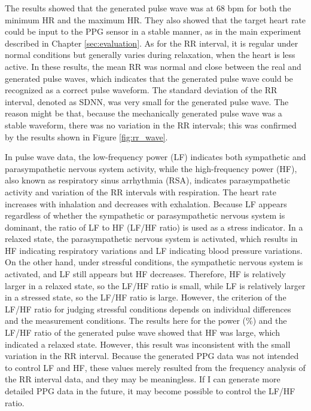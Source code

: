 The results showed that the generated pulse wave was at 68 bpm for both the minimum HR and the maximum HR. They also showed that the target heart rate could be input to the PPG sensor in a stable manner, as in the main experiment described in Chapter \ref{sec:evaluation}. As for the RR interval, it is regular under normal conditions but generally varies during relaxation, when the heart is less active. In these results, the mean RR was normal and close between the real and generated pulse waves, which indicates that the generated pulse wave could be recognized as a correct pulse waveform. The standard deviation of the RR interval, denoted as SDNN, was very small for the generated pulse wave. The reason might be that, because the mechanically generated pulse wave was a stable waveform, there was no variation in the RR intervals; this was confirmed by the results shown in Figure \ref{fig:rr_wave}.\par

In pulse wave data, the low-frequency power (LF) indicates both sympathetic and parasympathetic nervous system activity, while the high-frequency power (HF), also known as respiratory sinus arrhythmia (RSA), indicates parasympathetic activity and variation of the RR intervals with respiration. The heart rate increases with inhalation and decreases with exhalation. Because LF appears regardless of whether the sympathetic or parasympathetic nervous system is dominant, the ratio of LF to HF (LF/HF ratio) is used as a stress indicator. In a relaxed state, the parasympathetic nervous system is activated, which results in HF indicating respiratory variations and LF indicating blood pressure variations. On the other hand, under stressful conditions, the sympathetic nervous system is activated, and LF still appears but HF decreases. Therefore, HF is relatively larger in a relaxed state, so the LF/HF ratio is small, while LF is relatively larger in a stressed state, so the LF/HF ratio is large. However, the criterion of the LF/HF ratio for judging stressful conditions depends on individual differences and the measurement conditions. The results here for the power (\%) and the LF/HF ratio of the generated pulse wave showed that HF was large, which indicated a relaxed state. However, this result was inconsistent with the small variation in the RR interval. Because the generated PPG data was not intended to control LF and HF, these values merely resulted from the frequency analysis of the RR interval data, and they may be meaningless. If I can generate more detailed PPG data in the future, it may become possible to control the LF/HF ratio.

